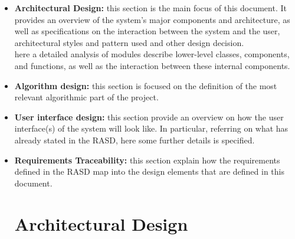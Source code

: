 \documentclass[10pt,a4paper]{report}
\begin{document}
\begin{itemize}
\item{\textbf{Architectural Design:}} this section is the main focus of this document. It provides an overview of the system's major components and architecture, as well as specifications on the interaction between the system and the user, architectural styles and pattern used and other design decision.\\

 here a detailed analysis of modules describe lower-level classes, components, and functions, as well as the interaction between these internal components.\\

\item{\textbf{Algorithm design:}} this section is focused on the definition of the most relevant algorithmic part of the project.

\item{\textbf{User interface design:}} this section provide an overview on how the user interface(s) of the system will look like. In particular, referring on what has already stated in the RASD, here some further details is specified.

\item{\textbf{Requirements Traceability:}} this section explain how the requirements defined in the RASD map into the design elements that are defined in this document.
\chapter{Architectural Design}
\end{itemize}
\end{document}
